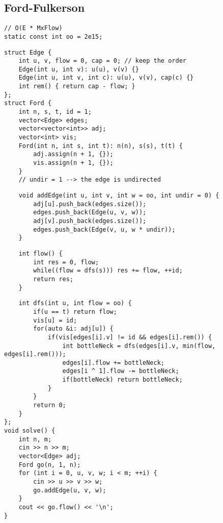 \documentclass[twoside]{article}
\begin{document}
\begin{multicols*}{2}
{\subsection*{Ford-Fulkerson}
}
\begin{verbatim}
// O(E * MxFlow)
static const int oo = 2e15;
\end{verbatim}
\vspace{-12pt}
\begin{verbatim}
struct Edge {
    int u, v, flow = 0, cap = 0; // keep the order
    Edge(int u, int v): u(u), v(v) {}
    Edge(int u, int v, int c): u(u), v(v), cap(c) {}
    int rem() { return cap - flow; }
};
struct Ford {
    int n, s, t, id = 1;
    vector<Edge> edges;
    vector<vector<int>> adj;
    vector<int> vis;
    Ford(int n, int s, int t): n(n), s(s), t(t) {
        adj.assign(n + 1, {});
        vis.assign(n + 1, {});
    }
    // undir = 1 --> the edge is undirected
\end{verbatim}
\vspace{-12pt}
\begin{verbatim}
    void addEdge(int u, int v, int w = oo, int undir = 0) {
        adj[u].push_back(edges.size());
        edges.push_back(Edge(u, v, w));
        adj[v].push_back(edges.size());
        edges.push_back(Edge(v, u, w * undir));
    }
\end{verbatim}
\vspace{-12pt}
\begin{verbatim}
    int flow() {
        int res = 0, flow;
        while((flow = dfs(s))) res += flow, ++id;
        return res;
    }
\end{verbatim}
\vspace{-12pt}
\begin{verbatim}
    int dfs(int u, int flow = oo) {
        if(u == t) return flow;
        vis[u] = id;
        for(auto &i: adj[u]) {
            if(vis[edges[i].v] != id && edges[i].rem()) {
                int bottleNeck = dfs(edges[i].v, min(flow, edges[i].rem()));
                edges[i].flow += bottleNeck;
                edges[i ^ 1].flow -= bottleNeck;
                if(bottleNeck) return bottleNeck;
            }
        }
        return 0;
    }
};
void solve() {
    int n, m;
    cin >> n >> m;
    vector<Edge> adj;
    Ford go(n, 1, n);
    for (int i = 0, u, v, w; i < m; ++i) {
        cin >> u >> v >> w;
        go.addEdge(u, v, w);
    }
    cout << go.flow() << '\n';
}
\end{verbatim}


\end{multicols*}
\end{document}
